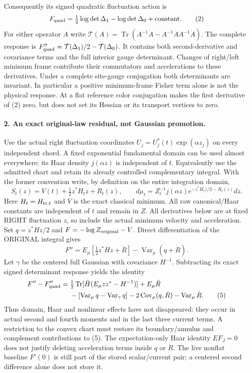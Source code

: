 \documentclass[11pt]{article}
\begin{document}
Consequently its signed quadratic fluctuation action is
\[
 F_{\rm quad}=\tfrac12\log\det\Delta_1-\log\det\Delta_0+\text{constant}.
                                                                    \tag{2}
\]
For either operator $A$ write
$\mathcal T(A)=\operatorname{Tr}(A^{-1}\ddot A-
 A^{-1}\dot A A^{-1}\dot A)$. The complete response is
$F_{\rm quad}''=\mathcal T(\Delta_1)/2-\mathcal T(\Delta_0)$.
It contains both second-derivative and covariance terms and the full
interior gauge determinant. Changes of right/left minimum frame contribute
their commutators and accelerations to these derivatives. Under a complete
site-gauge conjugation both determinants are invariant. In particular a
positive minimum-frame Fisher term alone is not the physical response.
At a flat reference color conjugation makes the first derivative of (2)
zero, but does not set its Hessian or its transport vertices to zero.

\paragraph{2. An exact original-law residual, not Gaussian promotion.}
Use the actual right fluctuation coordinates
$U_j=U_j^*(t)\exp(\alpha z_j)$ on every independent chord. A fixed exponential
fundamental domain can be used almost everywhere; its Haar density
$j(\alpha z)$ is independent of $t$. Equivalently use the admitted chart
and retain its already controlled complementary integral. With the former
convention write, by definition on the entire integration domain,
\[
 S_t(z)=V(t)+\tfrac12 z^*H_tz+R_t(z),\qquad
 d\mu_t=Z_t^{-1}j(\alpha z)e^{-z^*H_tz/2-R_t(z)}dz.                  \tag{3}
\]
Here $H_t=H_{{\rm tr},t}$ and $V$ is the exact classical minimum. All raw
canonical/Haar constants are independent of $t$ and remain in $Z$.
All derivatives below are at fixed RIGHT fluctuation $z$, so include the
actual minimum velocity and acceleration. Set $q=z^*\dot H z/2$ and
$F=-\log Z_{\rm original}-V$. Direct differentiation of the ORIGINAL
integral gives
\[
 F''=E_\mu[\tfrac12 z^*\ddot H z+\ddot R]
           -\operatorname{Var}_\mu(q+\dot R).                       \tag{4}
\]
Let $\gamma$ be the centered full Gaussian with covariance $H^{-1}$.
Subtracting its exact signed determinant response yields the identity
\begin{align}
 F''-F_{\rm quad}''={}&\tfrac12\operatorname{Tr}
   [\ddot H(E_\mu zz^*-H^{-1})]+E_\mu\ddot R\\
 &-[\operatorname{Var}_\mu q-\operatorname{Var}_\gamma q]
   -2\operatorname{Cov}_\mu(q,\dot R)-\operatorname{Var}_\mu\dot R.
                                                                    \tag{5}
\end{align}
Thus domain, Haar and nonlinear effects have not disappeared: they occur
in actual second and fourth moments and in the last three current terms.
A restriction to the convex chart must restore its boundary/annulus and
complement contributions to (5). The expectation-only Haar identity
$E F_J=0$ does not justify deleting acceleration terms inside $q$ or
$\ddot R$. The live nonflat baseline $F'(0)$ is still part of the stored
scalar/current pair; a centered second difference alone does not store it.
\end{document}
